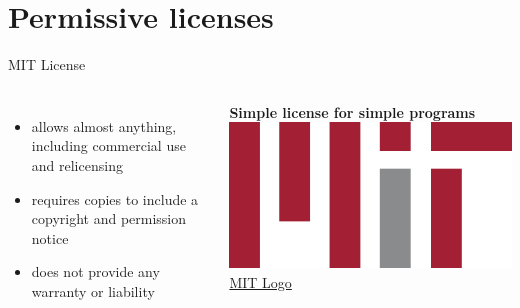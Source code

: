 \documentclass[10pt, graphics, aspectratio=169, table]{beamer}
\begin{document}
    \section{Permissive licenses}
    \begin{frame}{MIT License}
        \begin{columns}
                \begin{itemize}
                    \item allows almost anything, including commercial use and relicensing
                    \item requires copies to include a copyright and permission notice
                    \item does not provide any warranty or liability
                \end{itemize}
                \textbf{Simple license for simple programs}
                \includegraphics[width=\textwidth]{img/MIT.png}
                \center\tiny\href{https://en.m.wikipedia.org/wiki/File:MIT_logo.svg}{MIT Logo}
        \end{columns}
    \end{frame}
\end{document}

